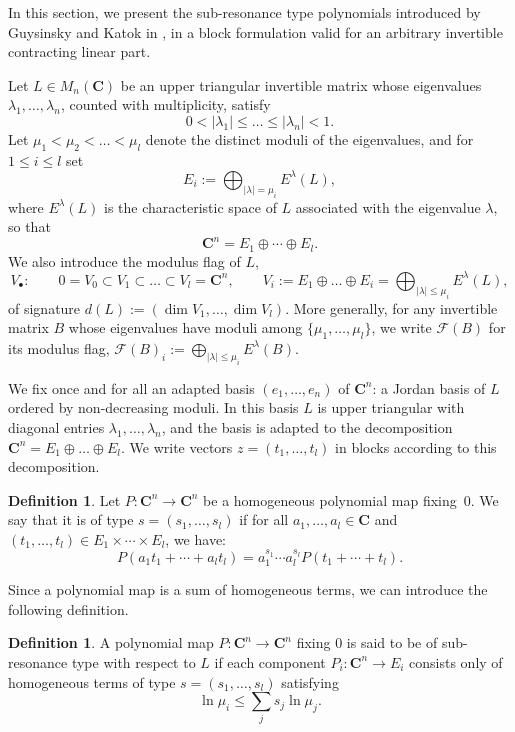 \documentclass[english,11pt]{amsart}
\theoremstyle{definition}
\newtheorem{definition}[theorem]{Definition}
\theoremstyle{remark}
\numberwithin{equation}{section}
\newcommand{\C}{\mathbf{C}}
\newcommand{\FF}{\mathcal{F}}
\begin{document}
In this section, we present the sub-resonance type polynomials introduced by Guysinsky and Katok in \cite{Katok}, in a block formulation valid for an arbitrary invertible contracting linear part.

Let $L \in M_n(\C)$ be an upper triangular invertible matrix whose eigenvalues $\lambda_1, \dots, \lambda_n$, counted with multiplicity, satisfy
\[
0 < |\lambda_1| \leq \dots \leq |\lambda_n| < 1.
\]
Let $\mu_1<\mu_2<\dots<\mu_l$ denote the distinct moduli of the eigenvalues, and for $1\le i\le l$ set
\[
E_i:=\bigoplus_{|\lambda|=\mu_i}E^{\lambda}(L),
\]
where $E^{\lambda}(L)$ is the characteristic space of $L$ associated with the eigenvalue $\lambda$, so that
\[
\C^n = E_1 \oplus \cdots \oplus E_l .
\]
We also introduce the modulus flag of $L$,
\[
V_\bullet:\qquad 0=V_0\subset V_1\subset\dots\subset V_l=\C^n,\qquad V_i:=E_1\oplus\dots\oplus E_i=\bigoplus_{|\lambda|\le\mu_i}E^\lambda(L),
\]
of signature $d(L):=(\dim V_1,\dots,\dim V_l)$. More generally, for any invertible matrix $B$ whose eigenvalues have moduli among $\{\mu_1,\dots,\mu_l\}$, we write $\FF(B)$ for its modulus flag, $\FF(B)_i:=\bigoplus_{|\lambda|\le\mu_i}E^\lambda(B)$.

We fix once and for all an adapted basis $(e_1,\dots,e_n)$ of $\C^n$: a Jordan basis of $L$ ordered by non-decreasing moduli. In this basis $L$ is upper triangular with diagonal entries $\lambda_1,\dots,\lambda_n$, and the basis is adapted to the decomposition $\C^n=E_1\oplus\dots\oplus E_l$. We write vectors $z=(t_1,\dots,t_l)$ in blocks according to this decomposition.

\begin{definition}\label{d:type}
Let $P: \C^n \to \C^n$ be a homogeneous polynomial map fixing~$0$. We say that it is of type $s = (s_1, \dots, s_l)$ if for all $a_1, \dots, a_l \in \C$ and $(t_1, \dots, t_l) \in E_1 \times \cdots \times E_l$, we have:
\[
P(a_1 t_1 + \cdots + a_l t_l) = a_1^{s_1} \cdots a_l^{s_l} P(t_1 + \cdots + t_l).
\]
\end{definition}


Since a polynomial map is a sum of homogeneous terms, we can introduce the following definition.

\begin{definition}\label{d:sr}
A polynomial map $P: \C^n \to \C^n$ fixing $0$ is said to be of sub-resonance type with respect to $L$ if each component $P_i: \C^n \to E_i$ consists only of homogeneous terms of type $s = (s_1, \dots, s_l)$ satisfying
\begin{equation}\label{eq:sr}
\ln \mu_i \leq \sum_j s_j \ln \mu_j.
\end{equation}
\end{definition}
\end{document}
